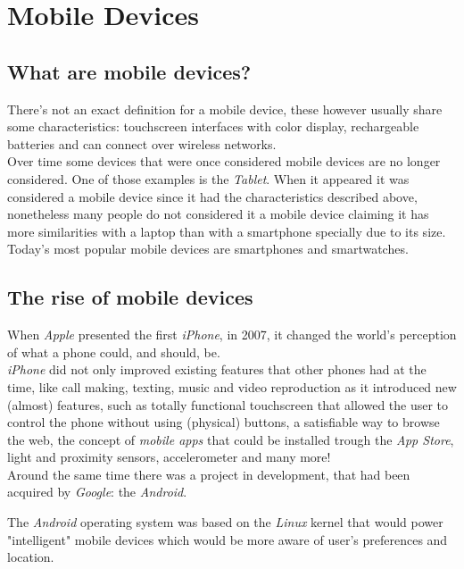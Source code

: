 \documentclass{llncs}
\begin{document}
\section{Mobile Devices}
\subsection{What are mobile devices?}
There's not an exact definition for a mobile device, these however usually share some characteristics: touchscreen interfaces with color display, rechargeable batteries and can connect over wireless networks.\\

Over time some devices that were once considered mobile devices are no longer considered. One of those examples is the \emph{Tablet}. When it appeared it was considered a mobile device since it had the characteristics described above, nonetheless many people do not considered it a mobile device claiming it has more similarities with a laptop than with a smartphone specially due to its size.\\

Today's most popular mobile devices are smartphones and smartwatches.
\subsection{The rise of mobile devices}
When \emph{Apple} presented the first \emph{iPhone}, in 2007, it changed the world's perception of what a phone could, and should, be.\\

\emph{iPhone} did not only improved existing features that other phones had at the time, like call making, texting, music and video reproduction as it introduced new (almost) features, such as totally functional touchscreen that allowed the user to control the phone without using (physical) buttons, a satisfiable way to browse the web, the concept of \emph{mobile apps} that could be installed trough the \emph{App Store}, light and proximity sensors, accelerometer and many more!\\

Around the same time there was a project in development, that had been acquired by \emph{Google}: the \emph{Android}.

The \emph{Android} operating system was based on the \emph{Linux} kernel that would power "intelligent" mobile devices which would be more aware of user's preferences and location.\\
\end{document}
